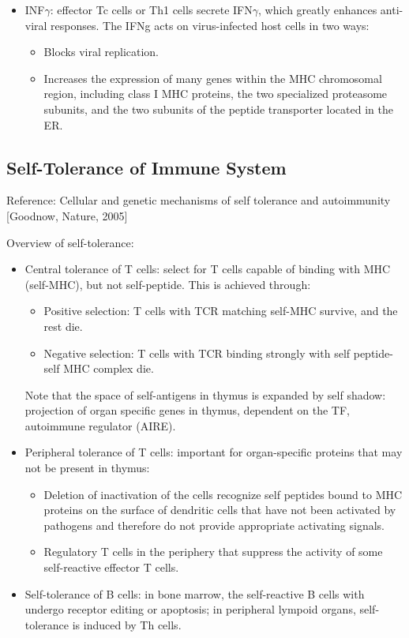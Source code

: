 \documentclass{report}
\begin{document}
\begin{itemize}
\item INF$\gamma$: effector Tc cells or Th1 cells secrete IFN$\gamma$, which greatly enhances anti-viral responses. The IFNg acts on virus-infected host cells in two ways: 
\begin{itemize}
	\item Blocks viral replication. 
	\item Increases the expression of many genes within the MHC chromosomal region, including class I MHC proteins, the two specialized proteasome subunits, and the two subunits of the peptide transporter located in the ER. 
\end{itemize}
\end{itemize}

\subsection{Self-Tolerance of Immune System}
Reference: Cellular and genetic mechanisms of self tolerance and autoimmunity [Goodnow, Nature, 2005]

Overview of self-tolerance: 
\begin{itemize}
\item Central tolerance of T cells: select for T cells capable of binding with MHC (self-MHC), but not self-peptide. This is achieved through: 
\begin{itemize}
	\item Positive selection: T cells with TCR matching self-MHC survive, and the rest die.
	\item Negative selection: T cells with TCR binding strongly with self peptide-self MHC complex die. 
\end{itemize}
Note that the space of self-antigens in thymus is expanded by self shadow: projection of organ specific genes in thymus, dependent on the TF, autoimmune regulator (AIRE).

\item Peripheral tolerance of T cells: important for organ-specific proteins that may not be present in thymus: 
\begin{itemize}
	\item Deletion of inactivation of the cells recognize self peptides bound to MHC proteins on the surface of dendritic cells that have not been activated by pathogens and therefore do not provide appropriate activating signals.
	\item Regulatory T cells in the periphery that suppress the activity of some self-reactive effector T cells. 
\end{itemize}

\item Self-tolerance of B cells: in bone marrow, the self-reactive B cells with undergo receptor editing or apoptosis; in peripheral lympoid organs, self-tolerance is induced by Th cells. 
\end{itemize}
\end{document}
